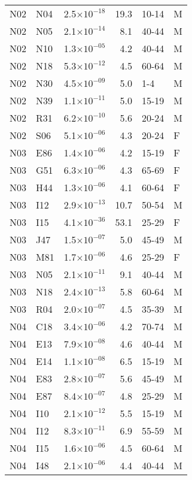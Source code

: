 \begin{longtable}{lllrll}
   N02 & N04 & 2.5$\times10^{-18}$ & 19.3 & 10-14 & M \\ 
   N02 & N05 & 2.1$\times10^{-14}$ & 8.1 & 40-44 & M \\ 
   N02 & N10 & 1.3$\times10^{-05}$ & 4.2 & 40-44 & M \\ 
   N02 & N18 & 5.3$\times10^{-12}$ & 4.5 & 60-64 & M \\ 
   N02 & N30 & 4.5$\times10^{-09}$ & 5.0 & 1-4 & M \\ 
   N02 & N39 & 1.1$\times10^{-11}$ & 5.0 & 15-19 & M \\ 
   N02 & R31 & 6.2$\times10^{-10}$ & 5.6 & 20-24 & M \\ 
   N02 & S06 & 5.1$\times10^{-06}$ & 4.3 & 20-24 & F \\ 
   N03 & E86 & 1.4$\times10^{-06}$ & 4.2 & 15-19 & F \\ 
   N03 & G51 & 6.3$\times10^{-06}$ & 4.3 & 65-69 & F \\ 
   N03 & H44 & 1.3$\times10^{-06}$ & 4.1 & 60-64 & F \\ 
   N03 & I12 & 2.9$\times10^{-13}$ & 10.7 & 50-54 & M \\ 
   N03 & I15 & 4.1$\times10^{-36}$ & 53.1 & 25-29 & F \\ 
   N03 & J47 & 1.5$\times10^{-07}$ & 5.0 & 45-49 & M \\ 
   N03 & M81 & 1.7$\times10^{-06}$ & 4.6 & 25-29 & F \\ 
   N03 & N05 & 2.1$\times10^{-11}$ & 9.1 & 40-44 & M \\ 
   N03 & N18 & 2.4$\times10^{-13}$ & 5.8 & 60-64 & M \\ 
   N03 & R04 & 2.0$\times10^{-07}$ & 4.5 & 35-39 & M \\ 
   N04 & C18 & 3.4$\times10^{-06}$ & 4.2 & 70-74 & M \\ 
   N04 & E13 & 7.9$\times10^{-08}$ & 4.6 & 40-44 & M \\ 
   N04 & E14 & 1.1$\times10^{-08}$ & 6.5 & 15-19 & M \\ 
   N04 & E83 & 2.8$\times10^{-07}$ & 5.6 & 45-49 & M \\ 
   N04 & E87 & 8.4$\times10^{-07}$ & 4.8 & 25-29 & M \\ 
   N04 & I10 & 2.1$\times10^{-12}$ & 5.5 & 15-19 & M \\ 
   N04 & I12 & 8.3$\times10^{-11}$ & 6.9 & 55-59 & M \\ 
   N04 & I15 & 1.6$\times10^{-06}$ & 4.5 & 60-64 & M \\ 
   N04 & I48 & 2.1$\times10^{-06}$ & 4.4 & 40-44 & M \\ 

\end{longtable}
